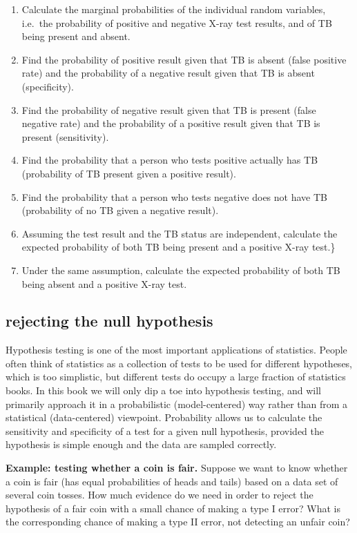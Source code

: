 \documentclass[
  letterpaper,
  DIV=11,
  numbers=noendperiod]{scrreprt}
\begin{document}
\begin{enumerate}
\def\labelenumi{\arabic{enumi}.}
\item
  Calculate the marginal probabilities of the individual random
  variables, i.e.~the probability of positive and negative X-ray test
  results, and of TB being present and absent.
\item
  Find the probability of positive result given that TB is absent (false
  positive rate) and the probability of a negative result given that TB
  is absent (specificity).
\item
  Find the probability of negative result given that TB is present
  (false negative rate) and the probability of a positive result given
  that TB is present (sensitivity).
\item
  Find the probability that a person who tests positive actually has TB
  (probability of TB present given a positive result).
\item
  Find the probability that a person who tests negative does not have TB
  (probability of no TB given a negative result).
\item
  Assuming the test result and the TB status are independent, calculate
  the expected probability of both TB being present and a positive X-ray
  test.\}
\item
  Under the same assumption, calculate the expected probability of both
  TB being absent and a positive X-ray test.
\end{enumerate}

\hypertarget{rejecting-the-null-hypothesis}{%
\subsection{rejecting the null
hypothesis}\label{rejecting-the-null-hypothesis}}

Hypothesis testing is one of the most important applications of
statistics. People often think of statistics as a collection of tests to
be used for different hypotheses, which is too simplistic, but different
tests do occupy a large fraction of statistics books. In this book we
will only dip a toe into hypothesis testing, and will primarily approach
it in a probabilistic (model-centered) way rather than from a
statistical (data-centered) viewpoint. Probability allows us to
calculate the sensitivity and specificity of a test for a given null
hypothesis, provided the hypothesis is simple enough and the data are
sampled correctly.

\textbf{Example: testing whether a coin is fair.} Suppose we want to
know whether a coin is fair (has equal probabilities of heads and tails)
based on a data set of several coin tosses. How much evidence do we need
in order to reject the hypothesis of a fair coin with a small chance of
making a type I error? What is the corresponding chance of making a type
II error, not detecting an unfair coin?
\end{document}
